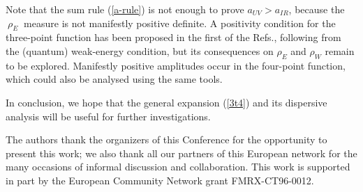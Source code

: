 \documentclass[proceedings]{JHEP}
\def\r{\rho}
\begin{document}
Note that the sum rule (\ref{a-rule}) is not enough to prove
$a_{UV} > a_{IR}$, 
because the $\ \r_E\ $ measure is not manifestly positive definite.
A positivity condition for the three-point function
has been proposed in the first of the Refs.\cite{ol}, following from 
the (quantum) weak-energy condition, but its consequences on $\r_E$
and $\r_W$ remain to be explored.
Manifestly positive amplitudes occur in the four-point function,
which could also be analysed using the same tools.

In conclusion, we hope that the general expansion (\ref{3t4})
and its dispersive analysis will be useful for further investigations.


\acknowledgments
The authors thank the organizers of this Conference for
the opportunity to present this work; we also thank all our
partners of this European network for the many occasions of
informal discussion and collaboration.
This work is supported in part by the European Community  
Network grant FMRX-CT96-0012. 




\def\NPB#1#2#3{{\it Nucl.~Phys.} {\bf{B#1}} (#2) #3} 
\def\CMP#1#2#3{{\it Commun.~Math.~Phys.} {\bf{#1}} (#2) #3} 
\def\CQG#1#2#3{{\it Class.~Quantum~Grav.} {\bf{#1}} (#2) #3} 
\def\PLB#1#2#3{{\it Phys.~Lett.} {\bf{B#1}} (#2) #3} 
\def\PRD#1#2#3{{\it Phys.~Rev.} {\bf{D#1}} (#2) #3} 
\def\PRL#1#2#3{{\it Phys.~Rev.~Lett.} {\bf{#1}} (#2) #3} 
\def\ZPC#1#2#3{{\it Z.~Phys.} {\bf C#1} (#2) #3} 
\def\PTP#1#2#3{{\it Prog.~Theor.~Phys.} {\bf#1}  (#2) #3} 
\def\MPLA#1#2#3{{\it Mod.~Phys.~Lett.} {\bf#1} (#2) #3} 
\def\PR#1#2#3{{\it Phys.~Rep.} {\bf#1} (#2) #3} 
\def\AP#1#2#3{{\it Ann.~Phys.} {\bf#1} (#2) #3} 
\def\RMP#1#2#3{{\it Rev.~Mod.~Phys.} {\bf#1} (#2) #3} 
\def\HPA#1#2#3{{\it Helv.~Phys.~Acta} {\bf#1} (#2) #3} 
\def\JETPL#1#2#3{{\it JETP~Lett.} {\bf#1} (#2) #3} 
\def\JHEP#1#2#3{{\it JHEP} {\bf#1} (#2) #3} 
\def\TH#1{{\tt hep-th/#1}} 
 
\end{document}
